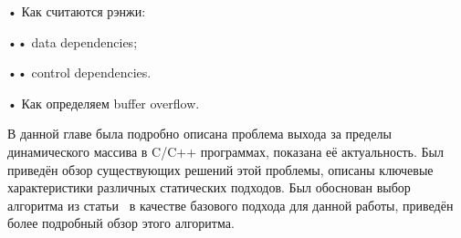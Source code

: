 • Как считаются рэнжи:

•• data dependencies;

•• control dependencies.

• Как определяем buffer overflow.

\chapterconclusion

В данной главе была подробно описана проблема выхода за пределы
динамического массива в C/C++ программах, показана её
актуальность. Был приведён обзор существующих решений этой проблемы,
описаны ключевые характеристики различных статических подходов. Был
обоснован выбор алгоритма из статьи~\cite{li2010practical} в качестве
базового подхода для данной работы, приведён более подробный обзор
этого алгоритма.

\FloatBarrier

